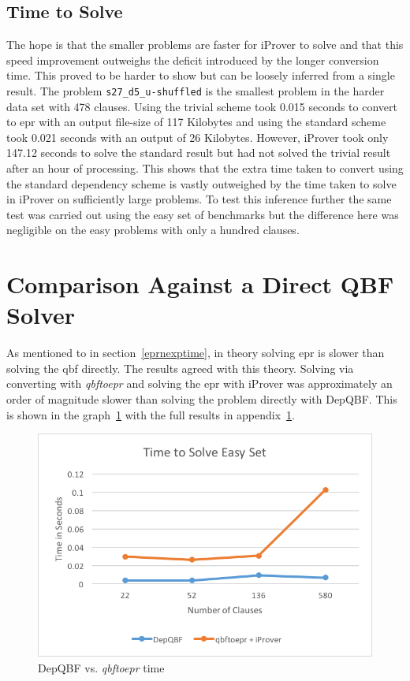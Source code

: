 \subsection{Time to Solve} \label{tvsstdsolve}
The hope is that the smaller problems are faster for iProver to solve and that this speed improvement outweighs the deficit introduced by the longer conversion time. This proved to be harder to show but can be loosely inferred from a single result. The problem \texttt{s27\_d5\_u-shuffled} is the smallest problem in the harder data set with 478 clauses. Using the trivial scheme took 0.015 seconds to convert to \gls{epr} with an output file-size of 117 Kilobytes and using the standard scheme took 0.021 seconds with an output of 26 Kilobytes. However, iProver took only 147.12 seconds to solve the standard result but had not solved the trivial result after an hour of processing. This shows that the extra time taken to convert using the standard dependency scheme is vastly outweighed by the time taken to solve in iProver on sufficiently large problems. To test this inference further the same test was carried out using the easy set of benchmarks but the difference here was negligible on the easy problems with only a hundred clauses.

\section{Comparison Against a Direct QBF Solver}
As mentioned to in section~\ref{eprnexptime}, in theory solving \gls{epr} is slower than solving the \gls{qbf} directly. The results agreed with this theory. Solving via converting with \textit{qbftoepr} and solving the \gls{epr} with iProver was approximately an order of magnitude slower than solving the problem directly with DepQBF. This is shown in the graph~\ref{depqbfvsqbftoepr} with the full results in appendix~\ref{depqbfvsqbftoepr}.

\begin{figure}[h]
\caption{DepQBF vs. \textit{qbftoepr} time}
\label{depqbfvsqbftoepr}
\begin{CenteredBox}
\includegraphics{depqbfvsqbftoepr.png}
\end{CenteredBox}
\end{figure}

